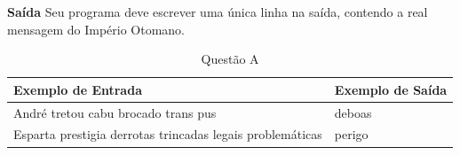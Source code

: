 \documentclass[a4paper, 12pt]{article}
\begin{document}
\textbf{{\large Saída}} \newline
Seu programa deve escrever uma única linha na saída, contendo a real mensagem do Império Otomano.
\newline
\begin{table}[H]
	\centering
	\begin{tabular}{|l|l|}
\hline
\textbf{Exemplo de Entrada}                               & \textbf{Exemplo de Saída} \\ \hline
André tretou cabu brocado trans pus                       & deboas                    \\ \hline
Esparta prestigia derrotas trincadas legais problemáticas & perigo                    \\ \hline
\end{tabular}
	\caption{Questão A}
	\label{tabela1}
\end{table}
\end{document}
